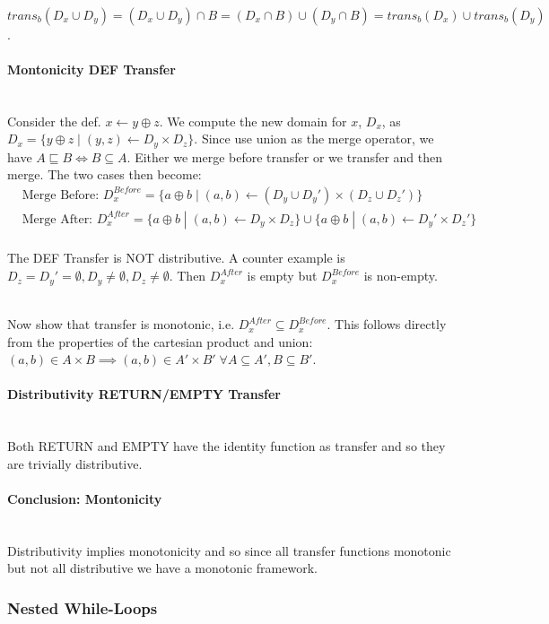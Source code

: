 \documentclass[a4paper]{article}
\newcommand{\NL}[0]{ \hfill\\\noindent }
\begin{document}
\NL
$trans_b(D_x \cup D_y) = (D_x \cup D_y) \cap B = (D_x \cap B) \cup (D_y \cap B) = trans_b(D_x) \cup trans_b(D_y)$.

\paragraph{Montonicity DEF Transfer}\NL
Consider the def. $x \leftarrow y \oplus z$. We compute the new domain for $x$, $D_x$, as $D_x = \{ y \oplus z \;|\; (y,z) \leftarrow D_y \times D_z\}$. Since use union as the merge operator, we have $A \sqsubseteq B \iff B \subseteq A$. Either we merge before transfer or we transfer and then merge. The two cases then become:
\begin{align*}
&\text{Merge Before: } D_x^{Before} = \{a \oplus b \; | \; (a, b) \leftarrow (D_y \cup D_y') \times (D_z \cup D_z') \} \\
&\text{Merge After: } D_x^{After} = \{a \oplus b \; | \; (a, b) \leftarrow D_y \times D_z \} \cup \{a \oplus b \; | \; (a, b) \leftarrow D_y' \times D_z' \}
\end{align*}
\NL
The DEF Transfer is NOT distributive. A counter example is $D_z = D_y' = \emptyset, D_y\neq \emptyset, D_z \neq \emptyset$. Then $D_x^{After}$ is empty but $D_x^{Before}$ is non-empty. 

\NL
Now show that transfer is monotonic, i.e. $D_x^{After} \subseteq D_x^{Before}$. This follows directly from the properties of the cartesian product and union: $(a,b) \in A \times B \implies (a,b) \in A' \times B' \;\forall A \subseteq A', B \subseteq B'$.

\paragraph{Distributivity RETURN/EMPTY Transfer}\NL
Both RETURN and EMPTY have the identity function as transfer and so they are trivially distributive.

\paragraph{Conclusion: Montonicity}\NL
Distributivity implies monotonicity and so since all transfer functions monotonic but not all distributive we have a monotonic framework. 

\subsubsection{Nested While-Loops}
\end{document}
